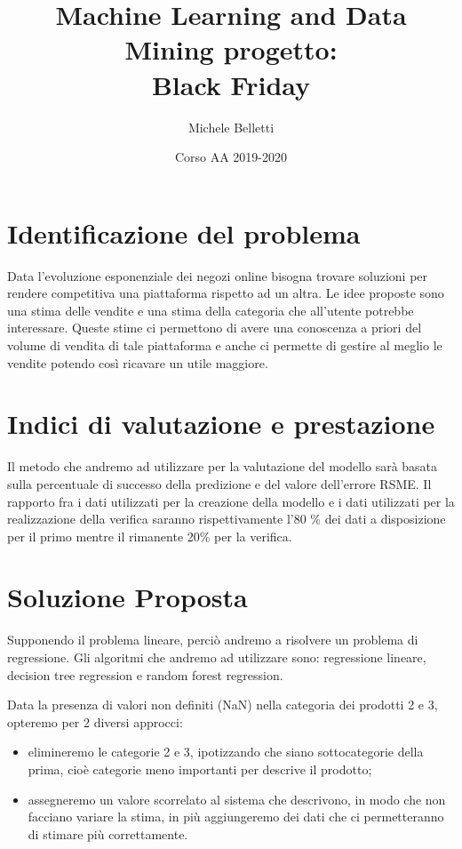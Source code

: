 \documentclass{article}
\title{Machine Learning and Data Mining progetto:\\Black Friday}
\author{Michele Belletti}
\date{Corso AA 2019-2020}
\begin{document}
\maketitle



\section{Identificazione del problema}
Data l'evoluzione esponenziale dei negozi online bisogna trovare soluzioni per rendere competitiva una piattaforma rispetto ad un altra. Le idee proposte sono una stima delle vendite e una stima della categoria che all'utente potrebbe interessare. Queste stime ci permettono di avere una conoscenza a priori del volume di vendita di tale piattaforma e anche ci permette di gestire al meglio le vendite potendo così ricavare un utile maggiore.

\section{Indici di valutazione e prestazione}
Il metodo che andremo ad utilizzare per la valutazione del modello sarà basata sulla percentuale di successo della predizione e del valore dell'errore RSME.
Il rapporto fra i dati utilizzati per la creazione della modello e i dati utilizzati per la realizzazione della verifica saranno rispettivamente l'80 \% dei dati a disposizione per il primo mentre il rimanente 20\% per la verifica.

\section{Soluzione Proposta}
Supponendo il problema  lineare, perciò andremo a risolvere un problema di regressione. Gli algoritmi che andremo ad utilizzare sono: regressione lineare, decision tree regression e random forest regression.

Data la presenza di valori non definiti (NaN) nella categoria dei prodotti 2 e 3, opteremo per 2 diversi approcci:
\begin{itemize}
\item elimineremo le categorie 2 e 3, ipotizzando che siano sottocategorie della prima, cioè categorie meno importanti per descrive il prodotto;
\item assegneremo un valore scorrelato al sistema che descrivono, in modo che non facciano variare la stima, in più aggiungeremo dei dati che ci permetteranno di stimare più correttamente.
\end{itemize}
\end{document}
